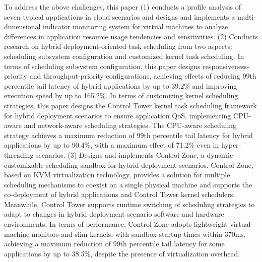To address the above challenges, this paper (1) conducts a profile analysis of seven typical applications in cloud scenarios and designs and implements a multi-dimensional indicator monitoring system for virtual machines to analyze differences in application resource usage tendencies and sensitivities. (2) Conducts research on hybrid deployment-oriented task scheduling from two aspects: scheduling subsystem configuration and customized kernel task scheduling. In terms of scheduling subsystem configuration, this paper designs responsiveness-priority and throughput-priority configurations, achieving effects of reducing 99th percentile tail latency of hybrid applications by up to 39.2\% and improving execution speed by up to 165.2\%. In terms of customizing kernel scheduling strategies, this paper designs the Control Tower kernel task scheduling framework for hybrid deployment scenarios to ensure application QoS, implementing CPU-aware and network-aware scheduling strategies. The CPU-aware scheduling strategy achieves a maximum reduction of 99th percentile tail latency for hybrid applications by up to 90.4\%, with a maximum effect of 71.2\% even in hyper-threading scenarios. (3) Designs and implements Control Zone, a dynamic customizable scheduling sandbox for hybrid deployment scenarios. Control Zone, based on KVM virtualization technology, provides a solution for multiple scheduling mechanisms to coexist on a single physical machine and supports the co-deployment of hybrid applications and Control Tower kernel schedulers. Meanwhile, Control Tower supports runtime switching of scheduling strategies to adapt to changes in hybrid deployment scenario software and hardware environments. In terms of performance, Control Zone adopts lightweight virtual machine monitors and slim kernels, with sandbox startup times within 370ms, achieving a maximum reduction of 99th percentile tail latency for some applications by up to 38.5\%, despite the presence of virtualization overhead.



\pagestyle{enfrontmatterstyle}%
\cleardoublepage\pagestyle{frontmatterstyle}%

